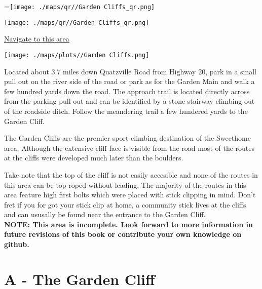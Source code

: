 \raggedcolumns
\begin{multicols}{2}
=\hbox{\texttt{[image: ./maps/qr//Garden Cliffs\_qr.png]}}%
\begin{center}
\texttt{[image: ./maps/qr//Garden Cliffs\_qr.png]}
\end{center}
\begin{center}
\underline{\textcolor{blue}{\href{http://maps.google.com/maps?q=44.43998124232581,-122.57539325959186}{Navigate to this area}}}
\end{center}


\texttt{[image: ./maps/plots//Garden Cliffs.png]}
\end{multicols}
\begin{multicols}{2}

Located about 3.7 miles down Quatzville Road from Highway 20, park in a small pull out on the river side of the road or park as for the Garden Main and walk a few hundred yards down the road. The approach trail is located directly across from the parking pull out and can be identified by a stone stairway climbing out of the roadside ditch. Follow the meandering trail a few hundered yards to the Garden Cliff.

The Garden Cliffs are the premier sport climbing destination of the Sweethome area. Although the extensive cliff face is visible from the road most of the routes at the cliffs were developed much later than the boulders.

Take note that the top of the cliff is not easily accesible and none of the routes in this area can be top roped without leading. The majority of the routes in this area feature high first bolts which were placed with stick clipping in mind. Don't fret if you for got your stick clip at home, a community stick lives at the cliffs and can ususally be found near the entrance to the Garden Cliff.\\
\textbf{NOTE: This area is incomplete. Look forward to more information in future revisions of this book or contribute your own knowledge on github.}\\



\newpage

\section{A - The Garden Cliff}\label{sa:The Garden Cliff}


\end{multicols}
